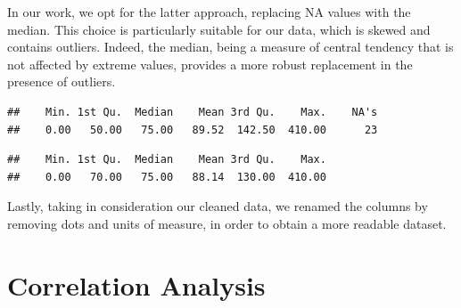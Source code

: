 \documentclass[
]{article}
\newenvironment{Shaded}{\begin{snugshade}}{\end{snugshade}}
\newcommand{\AttributeTok}[1]{\textcolor[rgb]{0.13,0.29,0.53}{#1}}
\newcommand{\CommentTok}[1]{\textcolor[rgb]{0.56,0.35,0.01}{\textit{#1}}}
\newcommand{\ConstantTok}[1]{\textcolor[rgb]{0.56,0.35,0.01}{#1}}
\newcommand{\FunctionTok}[1]{\textcolor[rgb]{0.13,0.29,0.53}{\textbf{#1}}}
\newcommand{\NormalTok}[1]{#1}
\newcommand{\OtherTok}[1]{\textcolor[rgb]{0.56,0.35,0.01}{#1}}
\newcommand{\SpecialCharTok}[1]{\textcolor[rgb]{0.81,0.36,0.00}{\textbf{#1}}}
\begin{document}
In our work, we opt for the latter approach, replacing NA values with
the median. This choice is particularly suitable for our data, which is
skewed and contains outliers. Indeed, the median, being a measure of
central tendency that is not affected by extreme values, provides a more
robust replacement in the presence of outliers.

\begin{Shaded}
\end{Shaded}

\begin{verbatim}
##    Min. 1st Qu.  Median    Mean 3rd Qu.    Max.    NA's 
##    0.00   50.00   75.00   89.52  142.50  410.00      23
\end{verbatim}

\begin{Shaded}
\end{Shaded}

\begin{verbatim}
##    Min. 1st Qu.  Median    Mean 3rd Qu.    Max. 
##    0.00   70.00   75.00   88.14  130.00  410.00
\end{verbatim}

Lastly, taking in consideration our cleaned data, we renamed the columns
by removing dots and units of measure, in order to obtain a more
readable dataset.

\section{Correlation Analysis}\label{correlation-analysis}
\end{document}
